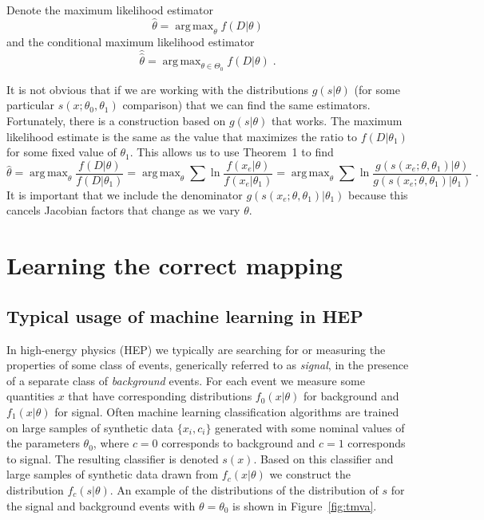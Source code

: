 \documentclass[11pt, oneside]{article}   	%
\DeclareMathOperator*{\argmax}{arg\,max}
\begin{document}
Denote the maximum likelihood estimator
\begin{equation}
\hat{\theta} = \argmax_\theta  f(D | \theta)
\end{equation}
and the conditional maximum likelihood estimator
\begin{equation}
\hat{\hat{\theta}} = \argmax_{\theta \in \Theta_0}  f(D | \theta) \; .
\end{equation}

It is not obvious that if we are working with the distributions $g(s|\theta)$ (for some particular $s(x; \theta_0, \theta_1)$ comparison) that we can find the same estimators. 
Fortunately, there is a construction based on $g(s|\theta)$ that works. The maximum likelihood estimate is the same as the value that maximizes the ratio to $f(D|\theta_1)$ for some fixed value of $\theta_1$. This allows us to use Theorem~1 to find
\begin{equation}
\hat{\theta} = \argmax_\theta \frac{ f(D | \theta)}{ f(D | \theta_1)} = \argmax_\theta  \sum \ln \frac{f(x_e | \theta)}{f(x_e|\theta_1)} = \argmax_\theta  \sum \ln \frac{g(s(x_e; \theta, \theta_1) | \theta)}{g(s(x_e; \theta, \theta_1) |\theta_1)} \; .
\end{equation}
It is important that we include the denominator $g(s(x_e; \theta, \theta_1) |\theta_1)$ because this cancels Jacobian factors that change as we vary $\theta$.

\section{Learning the correct mapping}


\subsection{Typical usage of machine learning in HEP}

In high-energy physics (HEP) we typically are searching for or measuring the properties of some 
class of events, generically referred to as \textit{signal}, in the presence of a separate class 
of \textit{background} events. For each event we measure some quantities $x$ that have corresponding distributions 
$f_0(x|\theta)$ for background and $f_1(x|\theta)$ for signal.  Often machine learning classification algorithms are trained on large samples of synthetic data $\{x_i, c_i\}$ generated with some nominal values of the parameters $\theta_0$, where $c=0$ corresponds to background and $c=1$ corresponds to signal. The resulting classifier is denoted $s(x)$. Based on this classifier and large samples of synthetic data drawn from $f_c(x | \theta)$ we construct the distribution  $f_c(s | \theta)$. An example of the distributions of the distribution of $s$ for the signal and background events with $\theta=\theta_0$ is shown in Figure~\ref{fig:tmva}.
\end{document}
